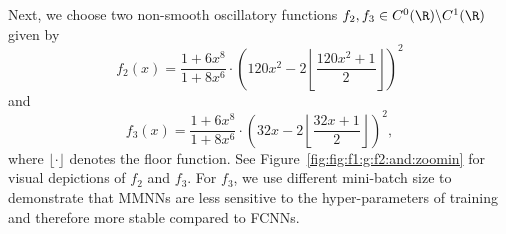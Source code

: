 \documentclass[11pt,a4paper]{article}
\begin{document}
Next, we choose two non-smooth oscillatory functions $f_2, f_3 \in C^0(\R)\backslash C^1(\R)$ given by 
\begin{equation}
\label{eq:def:f2:C0:MMNN:vs:FCNN}
    f_2(x) = 
\frac{1 + 6x^8}{1 + 8x^6} \cdot 
\left( 120x^2 - 2 \left\lfloor \frac{120x^2 + 1}{2} \right\rfloor \right)^2
\end{equation}
and 
\begin{equation}
\label{eq:def:f3:C0:MMNN:vs:FCNN}
    f_3(x) = 
\frac{1 + 6x^8}{1 + 8x^6} \cdot 
\left( 32x  - 2 \left\lfloor \frac{32 x  + 1}{2} \right\rfloor \right)^2,
\end{equation}
where $\lfloor \cdot \rfloor$ denotes the floor function.
See Figure~\ref{fig:fig:f1:g:f2:and:zoomin} for visual depictions of \( f_2 \) and \( f_3 \).
For \( f_3 \), we use different mini-batch size to demonstrate that MMNNs are less sensitive to the hyper-parameters of training and therefore more stable compared to FCNNs. 
\end{document}
